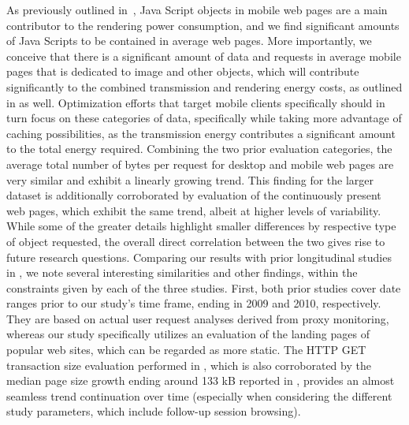 \documentclass[journal,final]{IEEEtran}
\begin{document}
%
%
As previously outlined in~\cite{ThAgNiBoSi12}, Java Script objects in mobile web pages are a main contributor to the rendering power consumption, and we find significant amounts of Java Scripts to be contained in average web pages.
More importantly, we conceive that there is a significant amount of data and requests in average mobile pages that is dedicated to image and other objects, which will contribute significantly to the combined transmission and rendering energy costs, as outlined in \cite{ThAgNiBoSi12} as well.
Optimization efforts that target mobile clients specifically should in turn focus on these categories of data, specifically while taking more advantage of caching possibilities, as the transmission energy contributes a significant amount to the total energy required.
%
%
Combining the two prior evaluation categories, the average total number of bytes per request for desktop and mobile web pages are very similar and exhibit a linearly growing trend.
This finding for the larger dataset is additionally corroborated by evaluation of the continuously present web pages, which exhibit the same trend, albeit at higher levels of variability.
While some of the greater details highlight smaller differences by respective type of object requested, the overall direct correlation between the two gives rise to future research questions.
%
%
Comparing our results with prior longitudinal studies in \cite{CaAlPa10,IhPa11}, we note several interesting similarities and other findings, within the constraints given by each of the three studies.
First, both prior studies cover date ranges prior to our study's time frame, ending in 2009 and 2010, respectively. They are based on actual user request analyses derived from proxy monitoring, whereas our study specifically utilizes an evaluation of the landing pages of popular web sites, which can be regarded as more static.
The HTTP GET transaction size evaluation performed in \cite{CaAlPa10}, which is also corroborated by the median page size growth ending around 133 kB reported in \cite{IhPa11}, provides an almost seamless trend continuation over time (especially when considering the different study parameters, which include follow-up session browsing).
\end{document}
